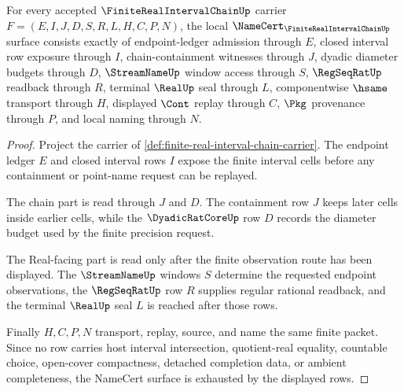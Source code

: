 \begin{theorem}
\label{thm:finite-real-interval-chain-namecert-obligations}
For every accepted $\FiniteRealIntervalChainUp$ carrier $F=(E,I,J,D,S,R,L,H,C,P,N)$, the local $\NameCert_{\FiniteRealIntervalChainUp}$ surface consists exactly of endpoint-ledger admission through $E$, closed interval row exposure through $I$, chain-containment witnesses through $J$, dyadic diameter budgets through $D$, $\StreamNameUp$ window access through $S$, $\RegSeqRatUp$ readback through $R$, terminal $\RealUp$ seal through $L$, componentwise $\hsame$ transport through $H$, displayed $\Cont$ replay through $C$, $\Pkg$ provenance through $P$, and local naming through $N$.
\end{theorem}
\begin{proof}
Project the carrier of \autoref{def:finite-real-interval-chain-carrier}. The endpoint ledger $E$ and closed interval rows $I$ expose the finite interval cells before any containment or point-name request can be replayed.

The chain part is read through $J$ and $D$. The containment row $J$ keeps later cells inside earlier cells, while the $\DyadicRatCoreUp$ row $D$ records the diameter budget used by the finite precision request.

The Real-facing part is read only after the finite observation route has been displayed. The $\StreamNameUp$ windows $S$ determine the requested endpoint observations, the $\RegSeqRatUp$ row $R$ supplies regular rational readback, and the terminal $\RealUp$ seal $L$ is reached after those rows.

Finally $H,C,P,N$ transport, replay, source, and name the same finite packet. Since no row carries host interval intersection, quotient-real equality, countable choice, open-cover compactness, detached completion data, or ambient completeness, the NameCert surface is exhausted by the displayed rows.
\end{proof}

